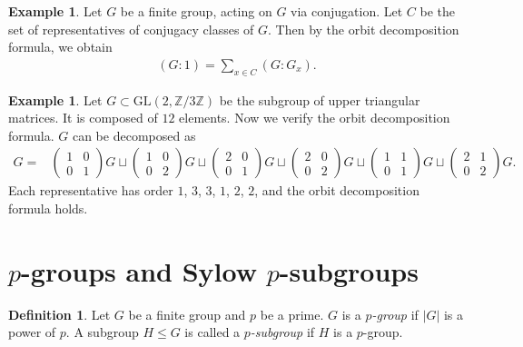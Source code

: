 \documentclass[12pt]{report}
\theoremstyle{plain}
\theoremstyle{remark}
\theoremstyle{definition}
\newtheorem{definition}[theorem]{Definition}
\newtheorem{example}[theorem]{Example}
\newcommand{\Z}{\mathbb{Z}}
\begin{document}
\begin{example}
    Let $G$ be a finite group, acting on $G$ via conjugation. Let $C$ be the set of representatives of conjugacy classes of $G$. Then by the orbit decomposition formula, we obtain
    \begin{align*}
        (G:1)=\sum_{x\in C}(G:G_x).
    \end{align*}
\end{example}

\begin{example}
    Let $G\subset \mathrm{GL}(2,\Z/3\Z)$ be the subgroup of upper triangular matrices. It is composed of $12$ elements. Now we verify the orbit decomposition formula. $G$ can be decomposed as
    \begin{align*}
        G =& \begin{pmatrix}
            1 & 0 \\ 0 & 1
        \end{pmatrix} G \sqcup \begin{pmatrix}
            1 & 0 \\ 0 & 2
        \end{pmatrix} G \sqcup \begin{pmatrix}
            2 & 0 \\ 0 & 1
        \end{pmatrix} G \sqcup \begin{pmatrix}
            2 & 0 \\ 0 & 2
        \end{pmatrix} G \sqcup \begin{pmatrix}
            1 & 1 \\ 0 & 1
        \end{pmatrix} G \sqcup \begin{pmatrix}
            2 & 1 \\ 0 & 2
        \end{pmatrix} G.
    \end{align*}
    Each representative has order $1$, $3$, $3$, $1$, $2$, $2$, and the orbit decomposition formula holds.
\end{example}


\section{\texorpdfstring{$p$-groups and Sylow $p$-subgroups}{p-groups and Sylow p-subgroups}}
\begin{definition}
    Let $G$ be a finite group and $p$ be a prime. $G$ is a \emph{$p$-group} if $|G|$ is a power of $p$. A subgroup $H\le G$ is called a \emph{$p$-subgroup} if $H$ is a $p$-group.
\end{definition}
\end{document}
